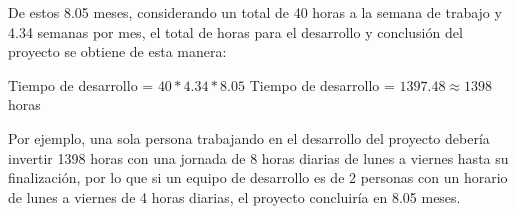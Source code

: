 De estos 8.05 meses, considerando un total de 40 horas a la semana de trabajo y 4.34 semanas por mes, el total de horas para el desarrollo y conclusión del proyecto se obtiene de esta manera:

\begin{center}
	Tiempo de desarrollo = $ 40 * 4.34 * 8.05 $
	Tiempo de desarrollo = $ 1397.48 \approx 1398 $ horas
\end{center}


Por ejemplo, una sola persona trabajando en el desarrollo del proyecto debería invertir 1398 horas con una jornada de 8 horas diarias de lunes a viernes hasta su finalización, por lo que si un equipo de desarrollo es de 2 personas con un horario de lunes a viernes de 4 horas diarias, el proyecto concluiría en 8.05 meses.

